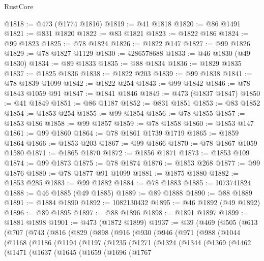 \begin{lexlean}{RustCore}
\begin{coremodule}
@1818 := @473 (@1774 @1816)
@1819 := @41 @1818
@1820 := @86 @1491
@1821 := @831 @1820
@1822 := @83 @1821
@1823 := @1822 @186
@1824 := @99 @1823
@1825 := @78 @1824
@1826 := @1822 @147
@1827 := @99 @1826
@1829 := @78 @1827 @1129
@1830 := 4286578688
@1833 := @46 @1830 (@49 @1830)
@1834 := @89 @1833
@1835 := @88 @1834
@1836 := @1829 @1835
@1837 := @1825 @1836
@1838 := @1822 @203
@1839 := @99 @1838
@1841 := @78 @1839 @1099
@1842 := @1822 @254
@1843 := @99 @1842
@1846 := @78 @1843 @1059 @91
@1847 := @1841 @1846
@1849 := @473 (@1837 @1847)
@1850 := @41 @1849
@1851 := @86 @1187
@1852 := @831 @1851
@1853 := @83 @1852
@1854 := @1853 @254
@1855 := @99 @1854
@1856 := @78 @1855
@1857 := @1853 @186
@1858 := @99 @1857
@1859 := @78 @1858
@1860 := @1853 @147
@1861 := @99 @1860
@1864 := @78 @1861 @1739 @1719
@1865 := @1859 @1864
@1866 := @1853 @203
@1867 := @99 @1866
@1870 := @78 @1867 @1059 @1580
@1871 := @1865 @1870
@1872 := @1856 @1871
@1873 := @1853 @109
@1874 := @99 @1873
@1875 := @78 @1874
@1876 := @1853 @268
@1877 := @99 @1876
@1880 := @78 @1877 @91 @1099
@1881 := @1875 @1880
@1882 := @1853 @285
@1883 := @99 @1882
@1884 := @78 @1883
@1885 := 1073741824
@1888 := @46 @1885 (@49 @1885)
@1889 := @89 @1888
@1890 := @88 @1889
@1891 := @1884 @1890
@1892 := 1082130432
@1895 := @46 @1892 (@49 @1892)
@1896 := @89 @1895
@1897 := @88 @1896
@1898 := @1891 @1897
@1899 := @1881 @1898
@1901 := @473 (@1872 @1899)
@1937 := @39
    (@469
      (@505
        (@613
          (@707
            (@743
              (@816
                (@829
                  (@898
                    (@916
                      (@930
                        (@946
                          (@971
                            (@988
                              (@1044
                                (@1168
                                  (@1186
                                    (@1194
                                      (@1197
                                        (@1235
                                          (@1271
                                            (@1324
                                              (@1344
                                                (@1369
                                                  (@1462
                                                    (@1471
                                                      (@1637
                                                        (@1645
                                                          (@1659
                                                            (@1696
                                                              (@1767

\end{coremodule}
\end{lexlean}
